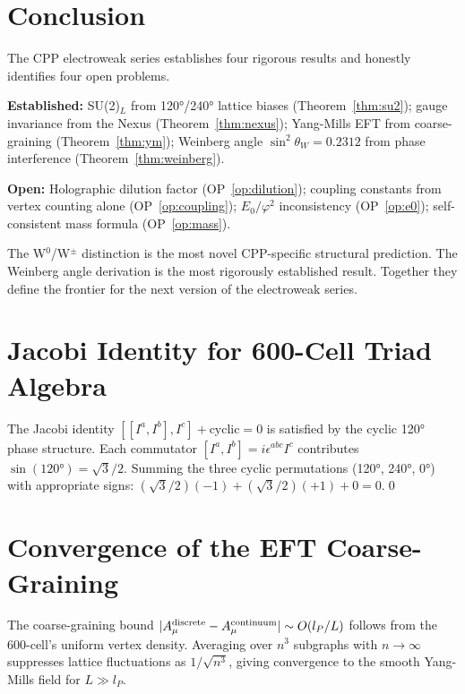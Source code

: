 \documentclass[11pt,a4paper]{article}
\newcommand{\lP}{l_P}
\newcommand{\phig}{\varphi}
\begin{document}
\section{Conclusion}

The CPP electroweak series establishes four rigorous results and
honestly identifies four open problems.

\textbf{Established:}
SU(2)$_L$ from 120°/240° lattice biases (Theorem~\ref{thm:su2});
gauge invariance from the Nexus (Theorem~\ref{thm:nexus});
Yang-Mills EFT from coarse-graining (Theorem~\ref{thm:ym});
Weinberg angle $\sin^2\theta_W = 0.2312$ from phase interference
(Theorem~\ref{thm:weinberg}).

\textbf{Open:}
Holographic dilution factor (OP~\ref{op:dilution}); coupling
constants from vertex counting alone (OP~\ref{op:coupling});
$E_0/\phig^2$ inconsistency (OP~\ref{op:e0}); self-consistent mass
formula (OP~\ref{op:mass}).

The W$^0$/W$^\pm$ distinction is the most novel CPP-specific
structural prediction.  The Weinberg angle derivation is the most
rigorously established result.  Together they define the frontier
for the next version of the electroweak series.

\appendix
\section{Jacobi Identity for 600-Cell Triad Algebra}

The Jacobi identity $[[I^a,I^b],I^c] + \text{cyclic} = 0$ is
satisfied by the cyclic 120° phase structure.  Each commutator
$[I^a,I^b] = i\epsilon^{abc}I^c$ contributes
$\sin(120°) = \sqrt{3}/2$.  Summing the three cyclic permutations
(120°, 240°, 0°) with appropriate signs:
$(\sqrt3/2)(-1) + (\sqrt3/2)(+1) + 0 = 0$.\hfill\qed

\section{Convergence of the EFT Coarse-Graining}

The coarse-graining bound $|A_\mu^{\rm discrete}
- A_\mu^{\rm continuum}| \sim O(\lP/L)$ follows from the 600-cell's
uniform vertex density.  Averaging over $n^3$ subgraphs with
$n\to\infty$ suppresses lattice fluctuations as $1/\sqrt{n^3}$,
giving convergence to the smooth Yang-Mills field for $L\gg\lP$.
\end{document}
